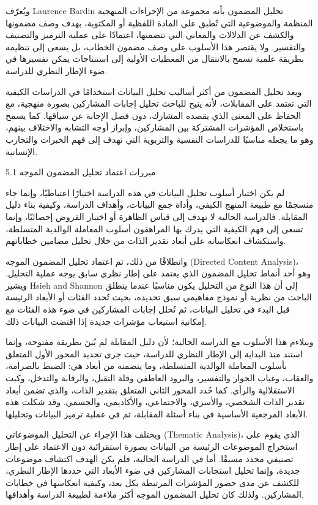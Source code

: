 \documentclass[12pt,oneside]{report}
\begin{document}
ويُعرّف Laurence Bardin تحليل المضمون بأنه مجموعة من الإجراءات المنهجية المنظمة والموضوعية التي تُطبق على المادة اللفظية أو المكتوبة، بهدف وصف مضمونها والكشف عن الدلالات والمعاني التي تتضمنها، اعتمادًا على عملية الترميز والتصنيف والتفسير. ولا يقتصر هذا الأسلوب على وصف مضمون الخطاب، بل يسعى إلى تنظيمه بطريقة علمية تسمح بالانتقال من المعطيات الأولية إلى استنتاجات يمكن تفسيرها في ضوء الإطار النظري للدراسة.

ويعد تحليل المضمون من أكثر أساليب تحليل البيانات استخدامًا في الدراسات الكيفية التي تعتمد على المقابلات، لأنه يتيح للباحث تحليل إجابات المشاركين بصورة منهجية، مع الحفاظ على المعنى الذي يقصده المشارك، دون فصل الإجابة عن سياقها. كما يسمح باستخلاص المؤشرات المشتركة بين المشاركين، وإبراز أوجه التشابه والاختلاف بينهم، وهو ما يجعله مناسبًا للدراسات النفسية والتربوية التي تهدف إلى فهم الخبرات والتجارب الإنسانية.

\textenglish{5.1}  مبررات اعتماد تحليل المضمون الموجه

لم يكن اختيار أسلوب تحليل البيانات في هذه الدراسة اختيارًا اعتباطيًا، وإنما جاء منسجمًا مع طبيعة المنهج الكيفي، وأداة جمع البيانات، وأهداف الدراسة، وكيفية بناء دليل المقابلة. فالدراسة الحالية لا تهدف إلى قياس الظاهرة أو اختبار الفروض إحصائيًا، وإنما تسعى إلى فهم الكيفية التي يدرك بها المراهقون أسلوب المعاملة الوالدية المتسلطة، واستكشاف انعكاساته على أبعاد تقدير الذات من خلال تحليل مضامين خطاباتهم.

وانطلاقًا من ذلك، تم اعتماد تحليل المضمون الموجه  (Directed Content Analysis)، وهو أحد أنماط تحليل المضمون الذي يعتمد على إطار نظري سابق يوجه عملية التحليل. ويشير Hsieh and Shannon  إلى أن هذا النوع من التحليل يكون مناسبًا عندما ينطلق الباحث من نظرية أو نموذج مفاهيمي سبق تحديده، بحيث تُحدد الفئات أو الأبعاد الرئيسة قبل البدء في تحليل البيانات، ثم تُحلل إجابات المشاركين في ضوء هذه الفئات مع إمكانية استيعاب مؤشرات جديدة إذا اقتضت البيانات ذلك.

ويتلاءم هذا الأسلوب مع الدراسة الحالية؛ لأن دليل المقابلة لم يُبنَ بطريقة مفتوحة، وإنما استند منذ البداية إلى الإطار النظري للدراسة، حيث جرى تحديد المحور الأول المتعلق بأسلوب المعاملة الوالدية المتسلطة، وما يتضمنه من أبعاد هي: الضبط بالصرامة، والعقاب، وغياب الحوار والتفسير، والبرود العاطفي وقلة التقبل، والرقابة والتدخل، وكبت الاستقلالية والرأي. كما حُدد المحور الثاني المتعلق بتقدير الذات، والذي تضمن أبعاد تقدير الذات الشخصي، والأسري، والاجتماعي، والأكاديمي، والجسمي. وقد شكلت هذه الأبعاد المرجعية الأساسية في بناء أسئلة المقابلة، ثم في عملية ترميز البيانات وتحليلها.

ويختلف هذا الإجراء عن التحليل الموضوعاتي  (Thematic Analysis)، الذي يقوم على استخراج الموضوعات الرئيسة من البيانات بصورة استقرائية دون الاعتماد على إطار تصنيفي محدد مسبقًا. أما في الدراسة الحالية، فلم يكن الهدف اكتشاف موضوعات جديدة، وإنما تحليل استجابات المشاركين في ضوء الأبعاد التي حددها الإطار النظري، للكشف عن مدى حضور المؤشرات المرتبطة بكل بعد، وكيفية انعكاسها في خطابات المشاركين. ولذلك كان تحليل المضمون الموجه أكثر ملاءمة لطبيعة الدراسة وأهدافها.
\end{document}
